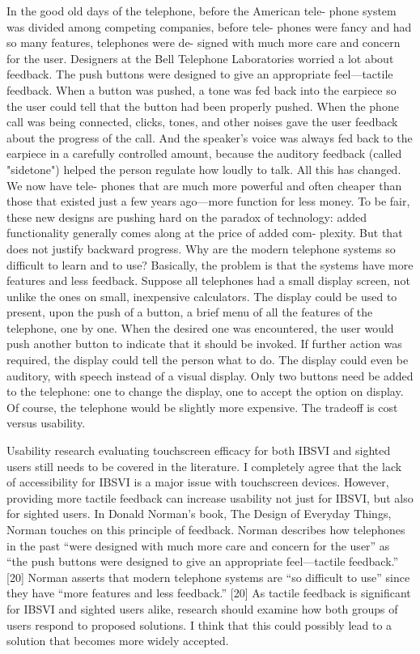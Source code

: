 \documentclass[11pt]{article}
\begin{document}
In the good old days of the telephone, before the American tele- phone system was divided among competing companies, before tele- phones were fancy and had so many features, telephones were de- signed with much more care and concern for the user. Designers at the Bell Telephone Laboratories worried a lot about feedback. The push buttons were designed to give an appropriate feel—tactile feedback. When a button was pushed, a tone was fed back into the earpiece so the user could tell that the button had been properly pushed. When the phone call was being connected, clicks, tones, and other noises gave the user feedback about the progress of the call. And the speaker's voice was always fed back to the earpiece in a carefully controlled amount, because the auditory feedback (called "sidetone") helped the person regulate how loudly to talk. All this has changed. We now have tele- phones that are much more powerful and often cheaper than those that existed just a few years ago—more function for less money. To be fair, these new designs are pushing hard on the paradox of technology: added functionality generally comes along at the price of added com- plexity. But that does not justify backward progress. 
Why are the modern telephone systems so difficult to learn and to use? Basically, the problem is that the systems have more features and less feedback. Suppose all telephones had a small display screen, not unlike the ones on small, inexpensive calculators. The display could be used to present, upon the push of a button, a brief menu of all the features of the telephone, one by one. When the desired one was encountered, the user would push another button to indicate that it should be invoked. If further action was required, the display could tell the person what to do. The display could even be auditory, with speech instead of a visual display. Only two buttons need be added to the 
telephone: one to change the display, one to accept the option on display. Of course, the telephone would be slightly more expensive. The tradeoff is cost versus usability.

Usability research evaluating touchscreen efficacy for both IBSVI and sighted users
still needs to be covered in the literature. I completely agree that the lack of accessibility
for IBSVI is a major issue with touchscreen devices. However, providing more tactile
feedback can increase usability not just for IBSVI, but also for sighted users. In Donald
Norman’s book, The Design of Everyday Things, Norman touches on this principle of
feedback. Norman describes how telephones in the past “were designed with much
more care and concern for the user” as “the push buttons were designed to give an
appropriate feel—tactile feedback.” [20] Norman asserts that modern telephone systems
are “so difficult to use” since they have “more features and less feedback.” [20] As tactile
feedback is significant for IBSVI and sighted users alike, research should examine how
both groups of users respond to proposed solutions. I think that this could possibly
lead to a solution that becomes more widely accepted.
\end{document}
